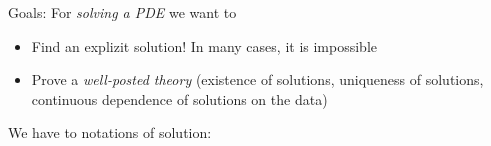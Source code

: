 \documentclass{report}
\theoremstyle{tommy}
\begin{document}

Goals: For \emph{solving a PDE} we want to
\begin{itemize}
  \item Find an explizit solution! In many cases, it is impossible
  \item Prove a \emph{well-posted theory} (existence of solutions, uniqueness of solutions, continuous dependence of solutions on the data)
\end{itemize}

We have to notations of solution:
\end{document}
